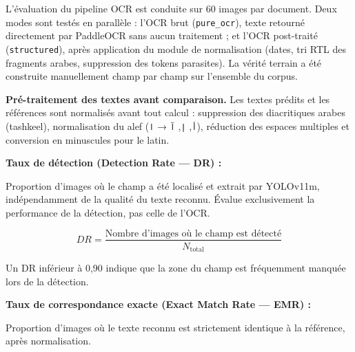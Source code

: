 \begin{tcolorbox}[
  enhanced,
  breakable,
  colback    = yolo_bg,
  colframe   = yolo_border,
  arc        = 4pt,
  boxrule    = 1.2pt,
  drop shadow,
  attach boxed title to top left = {yshift=-3mm, xshift=8mm},
  boxed title style = {
    colback   = yolo_header,
    colframe  = yolo_border,
    arc       = 3pt,
    boxrule   = 0.8pt,
    fontupper = \bfseries\color{white}\small
  },
  title = {\faFont\quad Métriques d'évaluation --- Pipeline OCR}
]

\noindent L'évaluation du pipeline OCR est conduite sur 60 images par document. Deux modes sont testés en parallèle : l'OCR brut (\texttt{pure\_ocr}), texte retourné directement par PaddleOCR sans aucun traitement ; et l'OCR post-traité (\texttt{structured}), après application du module de normalisation (dates, tri RTL des fragments arabes, suppression des tokens parasites). La vérité terrain a été construite manuellement champ par champ sur l'ensemble du corpus.

\medskip
\noindent\textbf{Pré-traitement des textes avant comparaison.} Les textes prédits et les références sont normalisés avant tout calcul : suppression des diacritiques arabes (tashkeel), normalisation du alef (\texttt{أ}, \texttt{إ}, \texttt{آ} → \texttt{ا}), réduction des espaces multiples et conversion en minuscules pour le latin.

\medskip

\noindent\textcolor{yolo_header}{}\; \textcolor{yolo_header}{\textbf{Taux de détection (Detection Rate --- DR) :}}

\noindent Proportion d'images où le champ a été localisé et extrait par YOLOv11m, indépendamment de la qualité du texte reconnu. Évalue exclusivement la performance de la détection, pas celle de l'OCR.

\begin{equation*}
  DR = \frac{\text{Nombre d'images où le champ est détecté}}{N_{\text{total}}}
\end{equation*}

\noindent Un DR inférieur à 0,90 indique que la zone du champ est fréquemment manquée lors de la détection.

\medskip

\noindent\textcolor{yolo_header}{}\; \textcolor{yolo_header}{\textbf{Taux de correspondance exacte (Exact Match Rate --- EMR) :}}

\noindent Proportion d'images où le texte reconnu est strictement identique à la référence, après normalisation.


\end{tcolorbox}
